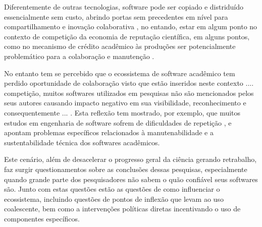 
Diferentemente de outras tecnologias, software pode ser copiado e distriduído
essencialmente sem custo, abrindo portas sem precedentes em nível para
compartilhamento e inovação colaborativa \cite{howison2011scientific}, no
entando, estar em algum ponto no contexto de competição da economia de
reputação científica, em alguns pontos, como no mecanismo de crédito acadêmico
às produções ser potencialmente problemático para a colaboração e manutenção
\cite{howison2011scientific}.

No entanto tem se percebido que o ecossistema de software acadêmico tem perdido
oportunidade de colaboração visto que estão inseridos neste contexto ....
competição, muitos softwares utilizados em pesquisas não são mencionados pelos
seus autores causando impacto negativo em sua visibilidade, reconhecimento e
consequentemente ...  \cite{howison2016software}. Esta reflexão tem mostrado,
por exemplo, que muitos estudos em engenharia de software sofrem de
dificuldades de repetição \cite{Tang2016}, e apontam problemas específicos
relacionados à manutenabilidade e a sustentabilidade técnica dos softwares
acadêmicos.

Este cenário, além de desacelerar o progresso geral da ciência gerando
retrabalho, faz surgir questionamentos sobre as conclusões dessas pesquisas,
especialmente quando grande parte dos pesquisadores não sabem o quão confiável
seus softwares são. Junto com estas questões estão as questões de como
influenciar o ecossistema, incluindo questões de pontos de inflexão que levam
ao uso coalescente, bem como a intervenções políticas diretas incentivando o
uso de componentes específicos.






